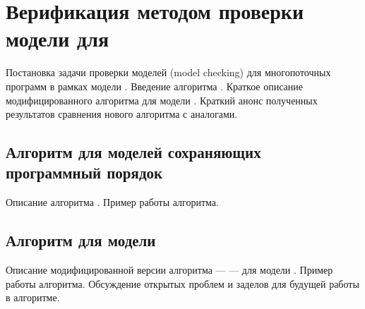 \chapter{Верификация методом проверки модели для \WkmS}
\label{ch:mc-weakestmo2}

Постановка задачи проверки моделей (model checking)
для многопоточных программ в рамках модели \WkmS.
Введение алгоритма \genmc.
Краткое описание модифицированного алгоритма \genmc
для модели \WkmS.
Краткий анонс полученных результатов сравнения нового алгоритма
с аналогами. 

\section{Алгоритм \genmc для моделей сохраняющих программный порядок}

Описание алгоритма \genmc. Пример работы алгоритма. 

\section{Алгоритм \wmc для модели \WkmS}

Описание модифицированной версии алгоритма \genmc --- \wmc ---
для модели \WkmS. Пример работы алгоритма.
Обсуждение открытых проблем и заделов
для будущей работы в алгоритме. 
